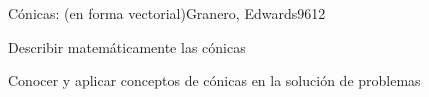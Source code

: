 \begin{syllabus}
\begin{unit}{Cónicas: (en forma vectorial)}{Granero, Edwards96}{12}
   \begin{unitgoals}
      \item Describir matemáticamente las cónicas
      \item Conocer y aplicar conceptos de cónicas en la solución de problemas
   \end{unitgoals}
\end{unit}

\begin{coursebibliography}
\end{coursebibliography}
\end{syllabus}
